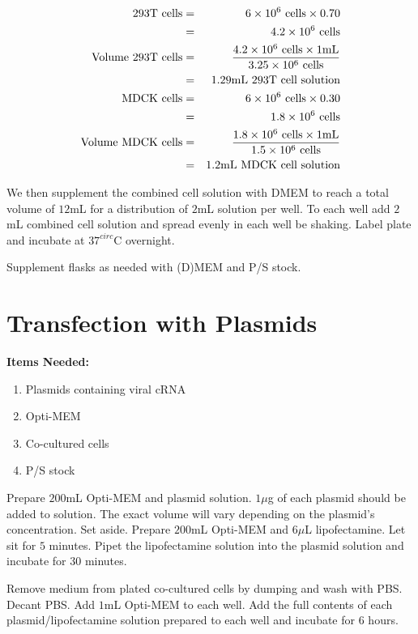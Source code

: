 \begin{eqnarray*}
%
%
\text{293T cells} &=& 6\e{6}\text{ cells} \times 0.70 \\
&=& 4.2\e{6}\text{ cells} \\
\text{Volume 293T cells} &=& \frac{4.2\e{6}\text{ cells} \times 1\text{mL}}{3.25\e{6}\text{ cells}} \\
&=& 1.29\text{mL 293T cell solution} \\
%
%
\text{MDCK cells} &=& 6\e{6}\text{ cells} \times 0.30 \\
&=& 1.8\e{6}\text{ cells} \\
\text{Volume MDCK cells} &=& \frac{1.8\e{6}\text{ cells} \times 1\text{mL}}{1.5\e{6}\text{ cells}} \\
&=& 1.2\text{mL MDCK cell solution} \\
\end{eqnarray*}

We then supplement the combined cell solution with DMEM to reach a total volume of $12$mL for a distribution of $2$mL solution per well. To each well add $2$mL combined cell solution and spread evenly in each well be shaking. Label plate and incubate at $37^{circ}$C overnight.

Supplement flasks as needed with (D)MEM and P/S stock.

\section{Transfection with Plasmids}

{\bfseries Items Needed:}
\begin{enumerate}
	\item Plasmids containing viral cRNA
	\item Opti-MEM
	\item Co-cultured cells
	\item P/S stock
\end{enumerate}

Prepare $200$mL Opti-MEM and plasmid solution. $1\mu$g of each plasmid should be added to solution. The exact volume will vary depending on the plasmid's concentration. Set aside. Prepare $200$mL Opti-MEM and $6\mu$L lipofectamine. Let sit for $5$ minutes. Pipet the lipofectamine solution into the plasmid solution and incubate for $30$ minutes.

Remove medium from plated co-cultured cells by dumping and wash with PBS. Decant PBS. Add $1$mL Opti-MEM to each well. Add the full contents of each plasmid/lipofectamine solution prepared to each well and incubate for $6$ hours.